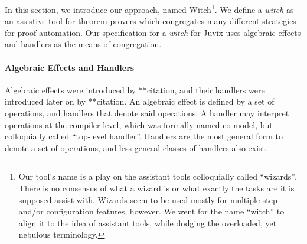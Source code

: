 \documentclass[sigconfl]{acmart}
\begin{document}
In this section, we introduce our approach, named Witch\footnote{Our tool's name is
  a play on the assistant tools colloquially called ``wizards''. There is no
  consensus of what a wizard is or what exactly the tasks are it is supposed
  assist with. Wizards seem to be used mostly for multiple-step and/or
  configuration features, however. We went for the name ``witch'' to align it to
  the idea of assistant tools, while dodging the overloaded, yet nebulous
  terminology.}. We define a \textit{witch} as an assistive tool for theorem
provers which congregates many different strategies for proof automation. Our
specification for a \textit{witch} for Juvix uses algebraic effects and handlers
as the means of congregation.

\paragraph{Algebraic Effects and Handlers} Algebraic effects were introduced by
**citation, and their handlers were introduced later on by **citation. An
algebraic effect is defined by a set of
operations, and handlers that denote said operations. A handler may interpret
operations at the compiler-level, which was formally named co-model, but
colloquially called ``top-level handler''. Handlers are the most general form to
denote a set of operations, and less general classes of handlers also exist.
\end{document}
